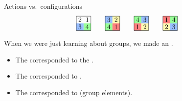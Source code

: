 \documentclass[8pt, handout]{beamer}
\newcommand{\Pause}{}      %
\begin{document}
\begin{frame}{Actions vs.\ configurations}
\[\begin{tikzpicture}[scale=.75]
      \path[fill=actBlue] (0,0) rectangle ++(.5,.5);
      \path[fill=actGreen] (.5,0) rectangle ++(.5,.5);
      \draw (0,0) rectangle (1,1);
      \draw (.25,.75) node{$2$}; \draw (.75,.75) node{$1$};
      \draw (.25,.25) node{$3$}; \draw (.75,.25) node{$4$};
    \end{tikzpicture}
    \qquad
    \begin{tikzpicture}[scale=.75]
      \path[fill=actBlue] (0,.5) rectangle ++(.5,.5); 
      \path[fill=actYellow] (.5,.5) rectangle ++(.5,.5);
      \path[fill=actGreen] (0,0) rectangle ++(.5,.5);
      \path[fill=actRed] (.5,0) rectangle ++(.5,.5);
      \draw (0,0) rectangle (1,1);
      \draw (.25,.75) node{$3$}; \draw (.75,.75) node{$2$};
        \draw (.25,.25) node{$4$}; \draw (.75,.25) node{$1$};
    \end{tikzpicture}
    \qquad
    \begin{tikzpicture}[scale=.75]
      \path[fill=actGreen] (0,.5) rectangle ++(.5,.5); 
      \path[fill=actBlue] (.5,.5) rectangle ++(.5,.5);
      \path[fill=actRed] (0,0) rectangle ++(.5,.5);
      \path[fill=actYellow] (.5,0) rectangle ++(.5,.5);
      \draw (0,0) rectangle (1,1);
      \draw (.25,.75) node{$4$}; \draw (.75,.75) node{$3$};
      \draw (.25,.25) node{$1$}; \draw (.75,.25) node{$2$};
    \end{tikzpicture}
    \qquad
    \begin{tikzpicture}[scale=.75]
      \path[fill=actRed] (0,.5) rectangle ++(.5,.5); 
      \path[fill=actGreen] (.5,.5) rectangle ++(.5,.5);
      \path[fill=actYellow] (0,0) rectangle ++(.5,.5);
      \path[fill=actBlue] (.5,0) rectangle ++(.5,.5);
      \draw (0,0) rectangle (1,1);
      \draw (.25,.75) node{$1$}; \draw (.75,.75) node{$4$};
      \draw (.25,.25) node{$2$}; \draw (.75,.25) node{$3$};
    \end{tikzpicture}
    \]

  \medskip\Pause

  When we were just learning about groups, we made an . \smallskip


  \begin{itemize}
    \item The  corresponded to the
      . \smallskip\Pause
    \item The  corresponded to . \smallskip\Pause
    \item The  corresponded to  (group
      elements).
  \end{itemize}

\end{frame}
\end{document}
